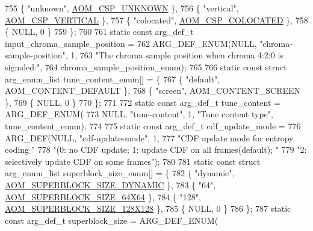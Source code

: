 \begin{DoxyCodeInclude}
{{{{{{{755   \{ \textcolor{stringliteral}{"unknown"}, \hyperlink{aom__image_8h_a10590253ef3dbde7e93ed5d4b4e0e73ba7843506f3e28f720be0d4f03237fb48c}{AOM\_CSP\_UNKNOWN} \},
756   \{ \textcolor{stringliteral}{"vertical"}, \hyperlink{aom__image_8h_a10590253ef3dbde7e93ed5d4b4e0e73baf95ced9b8288642205301cc51e0b55c6}{AOM\_CSP\_VERTICAL} \},
757   \{ \textcolor{stringliteral}{"colocated"}, \hyperlink{aom__image_8h_a10590253ef3dbde7e93ed5d4b4e0e73ba01ef7204c2234ef43acfd493d5e18c84}{AOM\_CSP\_COLOCATED} \},
758   \{ NULL, 0 \}
759 \};
760 
761 \textcolor{keyword}{static} \textcolor{keyword}{const} arg\_def\_t input\_chroma\_sample\_position =
762     ARG\_DEF\_ENUM(NULL, \textcolor{stringliteral}{"chroma-sample-position"}, 1,
763                  \textcolor{stringliteral}{"The chroma sample position when chroma 4:2:0 is signaled:"},
764                  chroma\_sample\_position\_enum);
765 
766 \textcolor{keyword}{static} \textcolor{keyword}{const} \textcolor{keyword}{struct }arg\_enum\_list tune\_content\_enum[] = \{
767   \{ \textcolor{stringliteral}{"default"}, AOM\_CONTENT\_DEFAULT \},
768   \{ \textcolor{stringliteral}{"screen"}, AOM\_CONTENT\_SCREEN \},
769   \{ NULL, 0 \}
770 \};
771 
772 \textcolor{keyword}{static} \textcolor{keyword}{const} arg\_def\_t tune\_content = ARG\_DEF\_ENUM(
773     NULL, \textcolor{stringliteral}{"tune-content"}, 1, \textcolor{stringliteral}{"Tune content type"}, tune\_content\_enum);
774 
775 \textcolor{keyword}{static} \textcolor{keyword}{const} arg\_def\_t cdf\_update\_mode =
776     ARG\_DEF(NULL, \textcolor{stringliteral}{"cdf-update-mode"}, 1,
777             \textcolor{stringliteral}{"CDF update mode for entropy coding "}
778             \textcolor{stringliteral}{"(0: no CDF update; 1: update CDF on all frames(default); "}
779             \textcolor{stringliteral}{"2: selectively update CDF on some frames"});
780 
781 \textcolor{keyword}{static} \textcolor{keyword}{const} \textcolor{keyword}{struct }arg\_enum\_list superblock\_size\_enum[] = \{
782   \{ \textcolor{stringliteral}{"dynamic"}, \hyperlink{group__codec_ggac34a24f7c6c0fef7518aed0da4425f61aaabb4d9ad771b2fa177ff6fb5437b179}{AOM\_SUPERBLOCK\_SIZE\_DYNAMIC} \},
783   \{ \textcolor{stringliteral}{"64"}, \hyperlink{group__codec_ggac34a24f7c6c0fef7518aed0da4425f61a5abd24080a18d4f7e33217d93a73e968}{AOM\_SUPERBLOCK\_SIZE\_64X64} \},
784   \{ \textcolor{stringliteral}{"128"}, \hyperlink{group__codec_ggac34a24f7c6c0fef7518aed0da4425f61a17127133dafcd42b1d792770981d67d0}{AOM\_SUPERBLOCK\_SIZE\_128X128} \},
785   \{ NULL, 0 \}
786 \};
787 \textcolor{keyword}{static} \textcolor{keyword}{const} arg\_def\_t superblock\_size = ARG\_DEF\_ENUM(
}}}}}}}
\end{DoxyCodeInclude}
